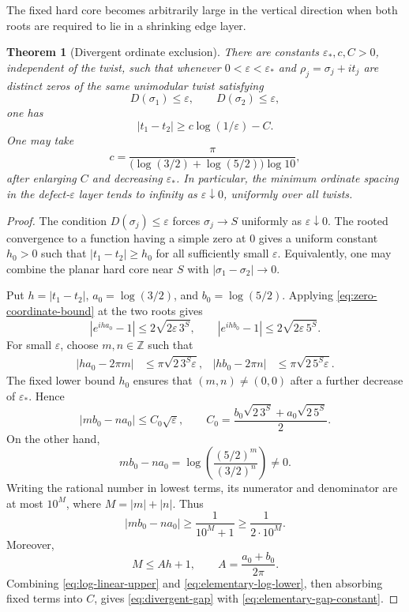 \documentclass[11pt]{article}
\newtheorem{theorem}{Theorem}[section]
\theoremstyle{definition}
\theoremstyle{remark}
\newcommand{\eps}{\varepsilon}
\begin{document}
The fixed hard core becomes arbitrarily large in the vertical direction
when both roots are required to lie in a shrinking edge layer.

\begin{theorem}[Divergent ordinate exclusion]
\label{thm:divergent-ordinate-exclusion}
There are constants $\eps_*,c,C>0$, independent of the twist, such that
whenever $0<\eps<\eps_*$ and $\rho_j=\sigma_j+it_j$ are distinct zeros
of the same unimodular twist satisfying
\[
 D(\sigma_1)\le\eps,
 \qquad D(\sigma_2)\le\eps,
\]
one has
\begin{equation}
 \boxed{
 |t_1-t_2|\ge c\log(1/\eps)-C.}
 \label{eq:divergent-gap}
\end{equation}
One may take
\begin{equation}
 c=\frac{\pi}
 {\bigl(\log(3/2)+\log(5/2)\bigr)\log 10},
 \label{eq:elementary-gap-constant}
\end{equation}
after enlarging $C$ and decreasing $\eps_*$.
In particular, the minimum ordinate spacing in the defect-$\eps$ layer
tends to infinity as $\eps\downarrow0$, uniformly over all twists.
\end{theorem}

\begin{proof}
The condition $D(\sigma_j)\le\eps$ forces $\sigma_j\to S$ uniformly as
$\eps\downarrow0$.  The rooted convergence to a function having a
simple zero at $0$ gives a uniform constant $h_0>0$ such that
$|t_1-t_2|\ge h_0$ for all sufficiently small $\eps$.  Equivalently,
one may combine the planar hard core near $S$ with
$|\sigma_1-\sigma_2|\to0$.

Put $h=|t_1-t_2|$, $a_0=\log(3/2)$, and $b_0=\log(5/2)$.  Applying
\eqref{eq:zero-coordinate-bound} at the two roots gives
\begin{equation}
 |e^{iha_0}-1|\le2\sqrt{2\eps\,3^S},
 \qquad
 |e^{ihb_0}-1|\le2\sqrt{2\eps\,5^S}.
 \label{eq:two-prime-recurrence}
\end{equation}
For small $\eps$, choose $m,n\in\mathbb Z$ such that
\begin{align}
 |ha_0-2\pi m|&\le\pi\sqrt{2\,3^S\eps},
 &|hb_0-2\pi n|&\le\pi\sqrt{2\,5^S\eps}.
 \label{eq:integer-phase-approximants}
\end{align}
The fixed lower bound $h_0$ ensures that $(m,n)\ne(0,0)$ after a further
decrease of $\eps_*$.  Hence
\begin{equation}
 |mb_0-na_0|\le C_0\sqrt\eps,
 \qquad
 C_0=\frac{b_0\sqrt{2\,3^S}+a_0\sqrt{2\,5^S}}2.
 \label{eq:log-linear-upper}
\end{equation}
On the other hand,
\[
 mb_0-na_0
 =\log\left(\frac{(5/2)^m}{(3/2)^n}\right)\ne0.
\]
Writing the rational number in lowest terms, its numerator and
denominator are at most $10^M$, where $M=|m|+|n|$.  Thus
\begin{equation}
 |mb_0-na_0|\ge\frac1{10^M+1}\ge\frac1{2\cdot10^M}.
 \label{eq:elementary-log-lower}
\end{equation}
Moreover,
\[
 M\le Ah+1,
 \qquad
 A=\frac{a_0+b_0}{2\pi}.
\]
Combining \eqref{eq:log-linear-upper} and
\eqref{eq:elementary-log-lower}, then absorbing fixed terms into $C$,
gives \eqref{eq:divergent-gap} with
\eqref{eq:elementary-gap-constant}.
\end{proof}
\end{document}
